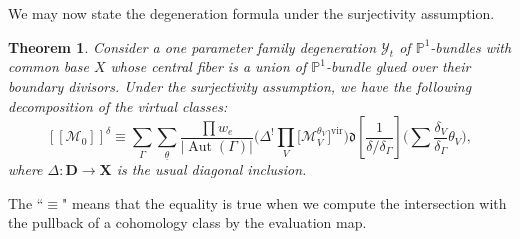 \documentclass[pdftex]{sigma}
\newcommand{\vir}[1]{\big[#1\big]^\mathrm{vir}}
\newcommand{\fvir}[2]{[\![ #1 ]\!]^{#2}}
\renewcommand{\d}[1]{\dfk\left[ #1 \right]}
\newcommand{\PP}{\mathbb{P}}
\newcommand{\btheta}{ {\underline{\theta}} }
\newcommand{\bfX}{ {\boldsymbol X} }
\newcommand{\bfD}{ {\boldsymbol D} }
\newcommand{\dfk}{\mathfrak{d}}
\newcommand{\M}{\mathcal{M}}
\newcommand{\Y}{\mathcal{Y}}
\numberwithin{equation}{section}
\newtheorem{theo}{Theorem}[section]
\theoremstyle{definition}
\begin{document}
We may now state the degeneration formula under the surjectivity assumption.

\begin{theo}\label{theo-refined-decomposition-surjective-case}
Consider a one parameter family degeneration $\Y_t$ of $\PP^1$-bundles with common base $X$ whose central fiber is a union of $\PP^1$-bundle glued over their boundary divisors. Under the surjectivity assumption, we have the following decomposition of the virtual classes:
\[ \fvir{\M_0}{\delta}
\equiv \sum_\Gamma\sum_\btheta \frac{\prod w_e}{|\operatorname{Aut}(\Gamma)|}\biggl(\Delta^!\prod_V\vir{\M_V^{\theta_V}} \biggr) \d{\frac{1}{\delta/\delta_\Gamma}}\biggl(\sum\frac{\delta_V}{\delta_\Gamma}\theta_V\biggr), \]
where $\Delta\colon\bfD\to\bfX$ is the usual diagonal inclusion.
\end{theo}

The ``$\equiv$" means that the equality is true when we compute the intersection with the pullback of a cohomology class by the evaluation map.
\end{document}
